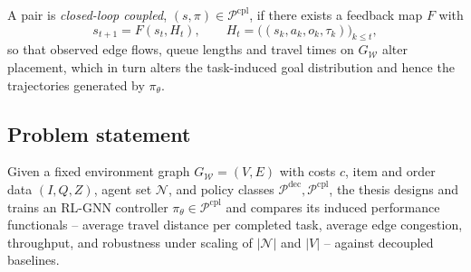 \documentclass[../main.tex]{subfiles}
\begin{document}
A pair is \emph{closed-loop coupled}, $(s,\pi) \in \mathcal{P}^{\mathrm{cpl}}$,
if there exists a feedback map $F$ with
\[
  s_{t+1} = F(s_t, H_t),
  \qquad
  H_t = \bigl( (s_k, a_k, o_k, \tau_k) \bigr)_{k \le t},
\]
so that observed edge flows, queue lengths and travel times on $G_{\mathcal{W}}$
alter placement, which in turn alters the task-induced goal distribution and
hence the trajectories generated by $\pi_\theta$.

\subsection{Problem statement}
Given a fixed environment graph $G_{\mathcal{W}} = (V,E)$ with costs $c$,
item and order data $(I, Q, Z)$, agent set $\mathcal{N}$, and policy classes
$\mathcal{P}^{\mathrm{dec}}, \mathcal{P}^{\mathrm{cpl}}$, the thesis designs and
trains an RL-GNN controller $\pi_\theta \in \mathcal{P}^{\mathrm{cpl}}$ and
compares its induced performance functionals -- average travel distance per
completed task, average edge congestion, throughput, and robustness under
scaling of $|\mathcal{N}|$ and $|V|$ -- against decoupled baselines.
\end{document}
